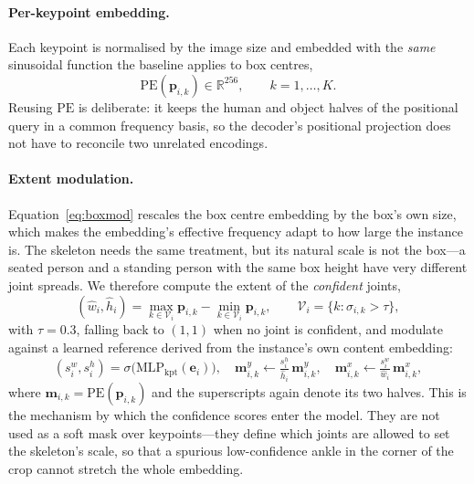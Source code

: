 \documentclass[12pt,a4paper]{article}
\newcommand{\be}{\mathbf{e}}
\newcommand{\bp}{\mathbf{p}}
\newcommand{\PE}{\mathrm{PE}}
\newcommand{\R}{\mathbb{R}}
\begin{document}
\paragraph{Per-keypoint embedding.} Each keypoint is normalised by the image
size and embedded with the \emph{same} sinusoidal function the baseline applies
to box centres,
\begin{equation}
\PE(\bp_{i,k}) \in \R^{256}, \qquad k = 1, \dots, K .
\end{equation}
Reusing $\PE$ is deliberate: it keeps the human and object halves of the
positional query in a common frequency basis, so the decoder's positional
projection does not have to reconcile two unrelated encodings.

\paragraph{Extent modulation.} Equation~\eqref{eq:boxmod} rescales the box
centre embedding by the box's own size, which makes the embedding's effective
frequency adapt to how large the instance is. The skeleton needs the same
treatment, but its natural scale is not the box---a seated person and a standing
person with the same box height have very different joint spreads. We therefore
compute the extent of the \emph{confident} joints,
\begin{equation}
(\hat{w}_i, \hat{h}_i) =
\max_{k \in \mathcal{V}_i} \bp_{i,k} - \min_{k \in \mathcal{V}_i} \bp_{i,k},
\qquad
\mathcal{V}_i = \{k : \sigma_{i,k} > \tau\},
\end{equation}
with $\tau = 0.3$, falling back to $(1,1)$ when no joint is confident, and
modulate against a learned reference derived from the instance's own content
embedding:
\begin{equation}
(s^w_i, s^h_i) = \sigma\big(\mathrm{MLP}_{\text{kpt}}(\be_i)\big),\quad
\mathbf{m}^{y}_{i,k} \leftarrow \tfrac{s^h_i}{\hat{h}_i}\,\mathbf{m}^{y}_{i,k},
\quad
\mathbf{m}^{x}_{i,k} \leftarrow \tfrac{s^w_i}{\hat{w}_i}\,\mathbf{m}^{x}_{i,k},
\end{equation}
where $\mathbf{m}_{i,k} = \PE(\bp_{i,k})$ and the superscripts again denote its
two halves.
This is the mechanism by which the confidence scores enter the model. They are
not used as a soft mask over keypoints---they define which joints are allowed
to set the skeleton's scale, so that a spurious low-confidence ankle in the
corner of the crop cannot stretch the whole embedding.
\end{document}
